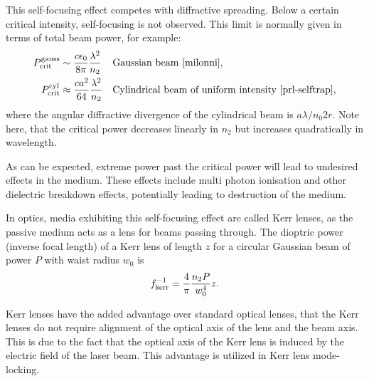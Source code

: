 This self-focusing effect competes with diffractive spreading.
Below a certain critical intensity, self-focusing is not observed. This limit
is normally given in terms of total beam power, for example:
\begin{align}
  \label{eq:1}
  P_{\textup{crit}}^{\textup{gauss}}
  &\sim \frac{c \epsilon_0}{8 \pi} \frac{\lambda^2}{n_2}
  &&\text{Gaussian beam \cite{milonni}},
  \\
  P_{\textup{crit}}^{\textup{cyl}}
  &\approx \frac{c a^2}{64} \frac{\lambda^2}{n_2}
  &&\text{Cylindrical beam of uniform intensity \cite{prl-selftrap}},
\end{align}
where the angular diffractive divergence of the cylindrical beam is $a
\lambda / n_0 2 r$. Note here, that the critical power decreases
linearly in $n_2$ but increases quadratically in wavelength.

As can be expected, extreme power past the critical power will lead to
undesired effects in the medium. These effects include multi photon
ionisation and other dielectric breakdown effects, potentially leading
to destruction of the medium.

In optics, media exhibiting this self-focusing effect are called Kerr
lenses, as the passive medium acts as a lens for beams passing
through. The dioptric power (inverse focal length) of a Kerr lens of
length $z$ for a circular Gaussian beam of power $P$ with waist radius
$w_0$ is
\cite{yefet-kerrlens}
\begin{align}
  \label{eq:kerr-focal-length}
  f_{\textup{kerr}}^{-1} = \frac{4}{\pi} \frac{n_2 P}{w_0^4} z.
\end{align}

Kerr lenses have the added advantage over standard optical lenses,
that the Kerr lenses do not require alignment of the optical axis of
the lens and the beam axis. This is due to the fact that the optical
axis of the Kerr lens is induced by the electric field of the laser
beam. This advantage is utilized in Kerr lens mode-locking.



